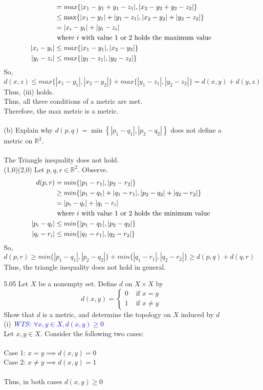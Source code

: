 \documentclass[12pt]{article}
\newcommand{\R}{\mathbb{R}}
\newcommand{\wts}[1]{\textit{\textcolor{blue}{WTS: #1}}\\}
\newcommand{\1}{^{-1}}
\begin{document}
\begin{enumerate}
\begin{align*}
				&= max\{|x_1-y_1+y_1-z_1|,|x_2-y_2+y_2-z_2|\}\\
				&\leq \max\{|x_1-y_1|+|y_1-z_1|,|x_2-y_2|+|y_2-z_2|\}\\
				&= |x_i-y_i|+|y_i-z_i| \\
				&\text{ where $ i $ with value 1 or 2 holds the maximum value}\\
		|x_i-y_i|&\leq max\{|x_1-y_1|,|x_2-y_2|\}\\
		|y_i-z_i|&\leq max\{|y_1-z_1|,|y_2-z_2|\}
	\end{align*}
	So, 
	\[d(x,z) \leq max\{|x_1-y_1|,|x_2-y_2|\} + max\{|y_1-z_1|,|y_2-z_2|\}=d(x,y)+d(y,z)\]
	Thus, (iii) holds.\\
	Thus, all three conditions of a metric are met.\\
	Therefore, the max metric is a metric.\\
	\\
	(b) Explain why $d(p, q)=\min \left\{\left|p_{1}-q_{1}\right|,\left|p_{2}-q_{2}\right|\right\}$ does not define a metric on $\mathbb{R}^{2}$.\\
	\\
		The Triangle inequality does not hold.\\ (1,0)(2,0)
	Let $ p,q,r \in \R^2 $. Observe.
		\begin{align*}
		d(p,r) &= min\{|p_1-r_1|,|p_2-r_2|\}\\
				&\geq min\{|p_1-q_1|+|q_1-r_1|,|p_2-q_2|+|q_2-r_2|\}\\
				&= |p_i-q_i|+|q_i-r_i|\\
				&\text{ where $ i $ with value 1 or 2 holds the minimum value}\\
				|p_i-q_i| &\leq min\{|p_1-q_1|,|p_2-q_2|\}\\
				|q_i-r_i| &\leq min\{|q_1-r_1|,|q_2-r_2|\}
		\end{align*}
	So, 
		\[d(p,r) \geq min\{|p_1-q_1|,|p_2-q_2|\} + min\{|q_1-r_1|,|q_2-r_2|\}\geq d(p,q)+d(q,r)\]
	Thus, the triangle inequality does not hold in general.
	\item[5.05]Let $X$ be a nonempty set. Define $d$ on $X \times X$ by
	$$
	d(x, y)=\left\{\begin{array}{ll}
	0 & \text { if } x=y \\
	1 & \text { if } x \neq y
	\end{array}\right.
	$$    
	Show that $d$ is a metric, and determine the topology on $X$ induced by $d$\\
	
	(i) \wts{$\forall x,y\in X, d(x, y) \geq 0$}
	Let $ x,y\in X $. Consider the following two cases:\\
	\\
	Case 1: $ x = y \implies d(x,y) = 0$\\
	Case 2: $ x \neq y \implies d(x,y) = 1$\\
	\\
	Thus, in both cases $ d(x,y) \geq 0 $\\
	

\end{enumerate}
\end{document}
